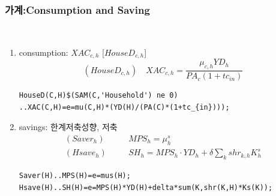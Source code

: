 \documentclass[10pt,compress,slidetop,%
			   hyperref={unicode},xcolor={svgnames},%
			   t]{beamer}
\begin{document}
\begin{frame}[fragile]
\frametitle{가계:Consumption and Saving}
\begin{scriptsize}\
\begin{enumerate}
\item{consumption: $XAC_{c,h}$ [$HouseD_{c,h}$]}
\begin{displaymath}
(HouseD_{c,h})\quad XAC_{c,h}=\frac{\mu_{c,h}YD_h}{PA_c(1+tc_{in})}
\end{displaymath}

\begin{verbatim}
HouseD(C,H)$(SAM(C,'Household') ne 0)
..XAC(C,H)=e=mu(C,H)*(YD(H)/(PA(C)*(1+tc_{in})));
\end{verbatim}

\item{savings: 한계저축성향, 저축}
\begin{eqnarray*}
(Saver_h)&\quad& MPS_h=\mu^s_h\\
(Hsave_h)&\quad& SH_h=MPS_h\cdot YD_h+\delta\sum_k shr_{k,h}K^s_h
\end{eqnarray*}
\begin{verbatim}
Saver(H)..MPS(H)=e=mus(H);
Hsave(H)..SH(H)=e=MPS(H)*YD(H)+delta*sum(K,shr(K,H)*Ks(K));
\end{verbatim}
\end{enumerate}
\end{scriptsize}
\end{frame}

\end{document}
